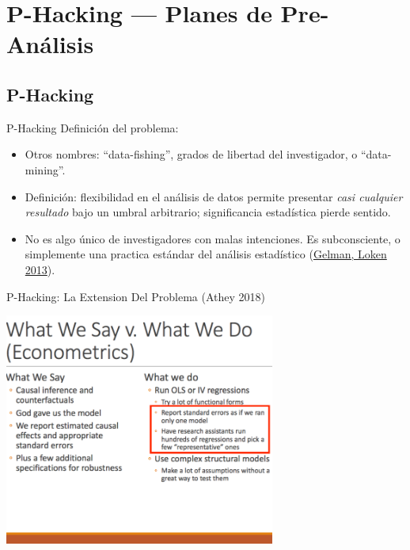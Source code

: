 \documentclass{beamer}
\begin{document}
\section{P-Hacking --- Planes de Pre-Análisis}
\subsection*{P-Hacking}
\begin{frame}[<.->]{P-Hacking}
Definición del problema:
\begin{itemize}
\item
Otros nombres: ``data-fishing'', grados de libertad del investigador, o ``data-mining''.
\item
Definición: flexibilidad en el análisis de datos permite presentar \textit{casi cualquier resultado} bajo un umbral arbitrario; significancia estadística pierde sentido.
\item
No es algo único de investigadores con malas intenciones. Es subconsciente, o simplemente una practica estándar del análisis estadístico (\href{http://www.stat.columbia.edu/~gelman/research/unpublished/p_hacking.pdf}{Gelman, Loken 2013}).
\end{itemize}
\end{frame}



\begin{frame}{P-Hacking: La Extension Del Problema (Athey 2018)}

\includegraphics[height=3in]{../Images/athey.PNG}

\end{frame}
\end{document}
